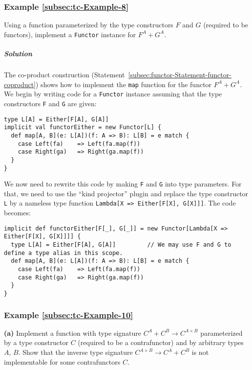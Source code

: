 \subsubsection{Example \label{subsec:tc-Example-8}\ref{subsec:tc-Example-8}}

Using a function parameterized by the type constructors $F$ and $G$
(required to be functors), implement a \lstinline!Functor! instance
for $F^{A}+G^{A}$.

\subparagraph{Solution}

The co-product construction (Statement~\ref{subsec:functor-Statement-functor-coproduct})
shows how to implement the \lstinline!map! function for the functor
$F^{A}+G^{A}$. We begin by writing code for a \lstinline!Functor!
instance assuming that the type constructors \lstinline!F! and \lstinline!G!
are given:
\begin{lstlisting}
type L[A] = Either[F[A], G[A]]
implicit val functorEither = new Functor[L] {
  def map[A, B](e: L[A])(f: A => B): L[B] = e match {
    case Left(fa)    => Left(fa.map(f))
    case Right(ga)   => Right(ga.map(f))
  }
}
\end{lstlisting}
We now need to rewrite this code by making \lstinline!F! and \lstinline!G!
into type parameters. For that, we need to use the \textsf{``}kind projector\textsf{''}
plugin and replace the type constructor \lstinline!L! by a nameless
type function \lstinline!Lambda[X => Either[F[X], G[X]]]!. The code
becomes:
\begin{lstlisting}
implicit def functorEither[F[_], G[_]] = new Functor[Lambda[X => Either[F[X], G[X]]]] {
  type L[A] = Either[F[A], G[A]]         // We may use F and G to define a type alias in this scope.
  def map[A, B](e: L[A])(f: A => B): L[B] = e match {
    case Left(fa)    => Left(fa.map(f))
    case Right(ga)   => Right(ga.map(f))
  }
}
\end{lstlisting}


\subsubsection{Example \label{subsec:tc-Example-10}\ref{subsec:tc-Example-10}}

\textbf{(a)} Implement a function with type signature $C^{A}+C^{B}\rightarrow C^{A\times B}$
parameterized by a type constructor $C$ (required to be a contrafunctor)
and by arbitrary types $A$, $B$. Show that the inverse type signature
$C^{A\times B}\rightarrow C^{A}+C^{B}$ is not implementable for some
contrafunctors $C$.

